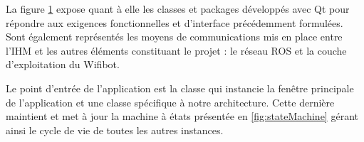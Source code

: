 \begin{figure}[h]
  \label{fig:modelIHM}
\end{figure}

La figure \ref{fig:modelIHM} expose quant à elle les classes et packages développés avec Qt pour répondre aux exigences fonctionnelles et d'interface précédemment formulées.   
Sont également représentés les moyens de communications mis en place entre l'IHM et les autres éléments constituant le projet : le réseau \gls{ROS} et la couche d'exploitation du Wifibot.

Le point d'entrée de l'application est la classe  qui instancie la fenêtre principale de l'application \cite{Bib_qmainwindow} et une classe  spécifique à notre architecture.
Cette dernière maintient et met à jour la machine à états présentée en \ref{fig:stateMachine} gérant ainsi le cycle de vie de toutes les autres instances.  

